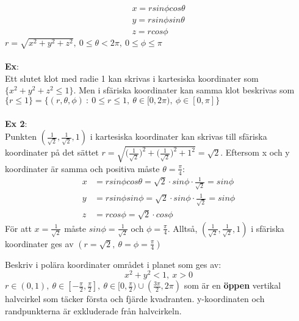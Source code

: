 \documentclass{report}
\begin{document}
{
\begin{align*}
x = rsin\phi cos\theta\\
y = rsin\phi sin\theta\\
z = rcos\phi
\end{align*}
$ r = \sqrt{x^2+y^2+z^2}, \: 0 \le \theta < 2\pi, \: 0 \le \phi \le \pi  $\\\\

\textbf{Ex}:\\
Ett slutet klot med radie 1 kan skrivas i kartesiska koordinater som $ \{ x^2+y^2+z^2 \le 1 \} $. Men i sfäriska koordinater kan samma klot beskrivas som $ \{ r \le 1	\}  = \{ (r, \theta, \phi) \: : \: 0 \le r \le  1, \: \theta \in [0,2\pi), \: \phi \in [0,\pi] \}$\\\\

\textbf{Ex 2}:\\
Punkten $ ( \frac{1}{ \sqrt{2} } , \frac{1}{ \sqrt{2} } , 1) $ i kartesiska koordinater kan skrivas till sfäriska koordinater på det sättet $ r = \sqrt{\bigl( \frac{1}{ \sqrt{2} }  \bigr)^2 + \bigl( \frac{1}{ \sqrt{2} }  \bigr)^2 + 1^2}  = \sqrt{2} $. Eftersom x och y koordinater är samma och positiva måste $ \theta = \frac{\pi}{4}  $:
\begin{align*}
	x &= rsin\phi cos\theta = \sqrt{2} \cdot sin \phi \cdot \frac{1}{ \sqrt{2} }  = sin \phi\\
	y &= rsin\phi sin\phi = \sqrt{2} \cdot sin\phi \cdot \frac{1}{ \sqrt{2} } = sin \phi\\
	z &= rcos\phi = \sqrt{2} \cdot  cos \phi
\end{align*}
För att $ x = \frac{1}{ \sqrt{2} }  $ måste $ sin\phi = \frac{1}{ \sqrt{2} }  $ och $ \phi = \frac{\pi}{4}  $. Alltså, $ ( \frac{1}{ \sqrt{2} } , \frac{1}{ \sqrt{2} } , 1 ) $ 	i sfäriska koordinater ges av $ (r = \sqrt{2}, \: \theta = \phi = \frac{\pi}{4} ) $ 
}

\qs{}
{
Beskriv i polära koordinater området i planet som ges av:
\begin{equation*}
x^2+y^2 < 1, \: x > 0
\end{equation*}
}
\sol $ r \in (0,1),\: \theta \in [- \frac{\pi}{2} , \frac{\pi}{2} ], \: \theta \in [0, \frac{\pi}{2} ) \cup ( \frac{3\pi}{2} , 2\pi) $ som är en \textbf{öppen} vertikal halvcirkel som täcker första och fjärde kvadranten. y-koordinaten och randpunkterna är exkluderade från halvcirkeln.
\vspace{20pt}
\end{document}
